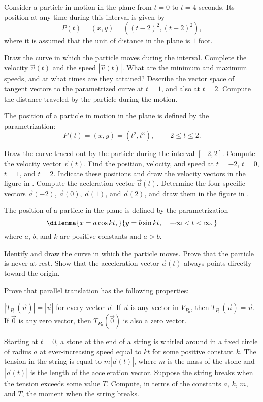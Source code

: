 \begin{exercises}
Consider a particle in motion in the plane from
$t=0$ to $t=4$ seconds.  Its position at any time
during this interval is given by
\[
P(t) = (x,y) = \left((t-2)^2, (t-2)^2\right)
,
\]
where it is assumed that the unit of distance
in the plane is $1$ foot.
\begin{exenum}
\x
Draw the curve in which the particle moves
during the interval.
\x
Complete the velocity $\vec v(t)$ and the speed
$|\vec v(t)|$.
What are the minimum and maximum speeds,
and at what times are they attained?
\x
Describe the vector space of tangent vectors to the
parametrized curve at $t=1$, and also at $t=2$.
\x
Compute the distance traveled by the particle during
the motion.
\end{exenum}

The position of a particle in motion in the plane
is defined by the parametrization:
\[
P(t) = (x,y) = (t^2,t^3), \quad -2 \leq t \leq 2
.
\]
\begin{exenum}
\x
{}
Draw the curve traced out by the particle during
the interval $[-2,2]$.
\x
Compute the velocity vector $\vec v(t)$.
Find the position, velocity, and speed at
$t=-2$, $t=0$, $t=1$, and $t=2$.
Indicate these positions and draw the
velocity vectors in the figure in .
\x
Compute the accleration vector $\vec a(t)$.
Determine the four specific vectors
$\vec a(-2)$, $\vec a(0)$, $\vec a(1)$, and $\vec a(2)$,
and draw them in the figure in .
\end{exenum}

The position of a particle in the plane is defined by the
parametrization
\[
\dilemma{x = a\cos kt,}
{y = b \sin kt, \quad -\infty < t < \infty,}
\]
where $a$, $b$, and $k$ are positive constants
and $a > b$.
\begin{exenum}
\x
Identify and draw the curve in which the particle moves.
\x
Prove that the particle is never at rest.
\x
Show that the acceleration vector $\vec a(t)$
always points directly toward the origin.
\end{exenum}

Prove that parallel translation has the following properties:
\begin{exenum}
\x
$|T_{P_0} (\vec u)| = |\vec u|$
for every vector $\vec u$.
\x
If $\vec u$ is any vector in $V_{P_0}$,
then $T_{P_0}(\vec u) = \vec u$.
\x
If $\vec 0$ is any zero vector,
then $T_{P_0}(\vec 0)$ is also a zero vector.
\end{exenum}

Starting at $t=0$, a stone at the end of a string
is whirled around in a fixed circle of radius $a$
at ever-increasing speed equal to $kt$ for some
positive constant $k$.
The tension in the string is equal to $m|\vec a(t)|$,
where $m$ is the mass of the stone and $|\vec a(t)|$
is the length of the acceleration vector.
Suppose the string breaks when the tension exceeds
some value $T$.
Compute, in terms of the constants $a$, $k$, $m$,
and $T$, the moment when the string breaks.

\end{exercises}
